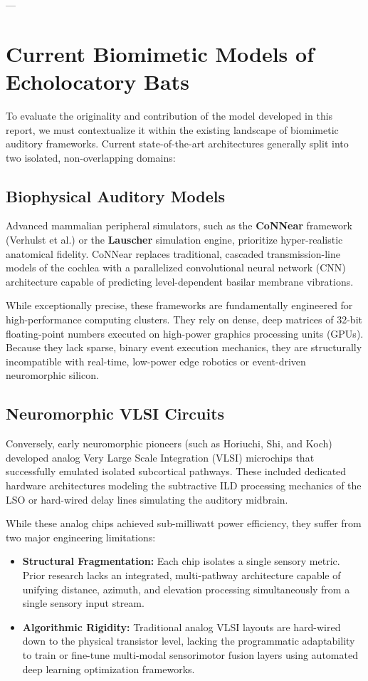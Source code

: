 ---

\section{Current Biomimetic Models of Echolocatory Bats}
To evaluate the originality and contribution of the model developed in this report, we must contextualize it within the existing landscape of biomimetic auditory frameworks. Current state-of-the-art architectures generally split into two isolated, non-overlapping domains:

\subsection{Biophysical Auditory Models}
Advanced mammalian peripheral simulators, such as the \textbf{CoNNear} framework (Verhulst et al.) or the \textbf{Lauscher} simulation engine, prioritize hyper-realistic anatomical fidelity. CoNNear replaces traditional, cascaded transmission-line models of the cochlea with a parallelized convolutional neural network (CNN) architecture capable of predicting level-dependent basilar membrane vibrations. 

While exceptionally precise, these frameworks are fundamentally engineered for high-performance computing clusters. They rely on dense, deep matrices of 32-bit floating-point numbers executed on high-power graphics processing units (GPUs). Because they lack sparse, binary event execution mechanics, they are structurally incompatible with real-time, low-power edge robotics or event-driven neuromorphic silicon.

\subsection{Neuromorphic VLSI Circuits}
Conversely, early neuromorphic pioneers (such as Horiuchi, Shi, and Koch) developed analog Very Large Scale Integration (VLSI) microchips that successfully emulated isolated subcortical pathways. These included dedicated hardware architectures modeling the subtractive ILD processing mechanics of the LSO or hard-wired delay lines simulating the auditory midbrain.

While these analog chips achieved sub-milliwatt power efficiency, they suffer from two major engineering limitations:
\begin{itemize}
    \item \textbf{Structural Fragmentation:} Each chip isolates a single sensory metric. Prior research lacks an integrated, multi-pathway architecture capable of unifying distance, azimuth, and elevation processing simultaneously from a single sensory input stream.
    \item \textbf{Algorithmic Rigidity:} Traditional analog VLSI layouts are hard-wired down to the physical transistor level, lacking the programmatic adaptability to train or fine-tune multi-modal sensorimotor fusion layers using automated deep learning optimization frameworks.
\end{itemize}

